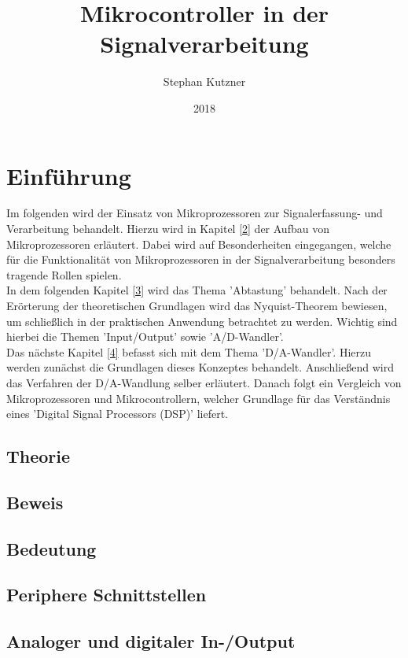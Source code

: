 \documentclass[a4paper,12pt]{article}
\title{Mikrocontroller in der Signalverarbeitung}
\date{2018}
\author{Stephan Kutzner}
\theoremstyle{plain}
\begin{document}
\maketitle
\tableofcontents
\section{Einführung}
Im folgenden wird der Einsatz von Mikroprozessoren zur Signalerfassung- und Verarbeitung behandelt. Hierzu wird in Kapitel \ref{2} der Aufbau von Mikroprozessoren erläutert. Dabei wird auf Besonderheiten eingegangen, welche für die Funktionalität von Mikroprozessoren in der Signalverarbeitung besonders tragende Rollen spielen.\\
In dem folgenden Kapitel \ref{3} wird das Thema 'Abtastung' behandelt. Nach der Erörterung der theoretischen Grundlagen wird das Nyquist-Theorem bewiesen, um schließlich in der praktischen Anwendung betrachtet zu werden. Wichtig sind hierbei die Themen 'Input/Output' sowie 'A/D-Wandler'.\\
Das nächste Kapitel \ref{4} befasst sich mit dem Thema 'D/A-Wandler'. Hierzu werden zunächst die Grundlagen dieses Konzeptes behandelt. Anschließend wird das Verfahren der D/A-Wandlung selber erläutert. Danach folgt ein Vergleich von Mikroprozessoren und Mikrocontrollern, welcher Grundlage für das Verständnis eines 'Digital Signal Processors (DSP)' liefert.\\

\newpage



\newpage

\newpage
\subsection{Theorie}\label{3.1}
\subsection{Beweis}\label{3.2}
\subsection{Bedeutung}\label{3.3}
\subsection{Periphere Schnittstellen}\label{3.4}
\subsection{Analoger und digitaler In-/Output}\label{3.5}
\newpage
\end{document}
